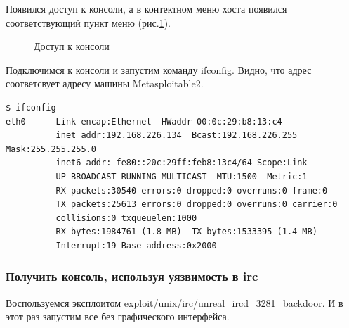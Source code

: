 \documentclass[10pt,a4paper,titlepage]{article}
\begin{document}
Появился доступ к консоли, а в контектном меню хоста появился соответствующий пункт меню (рис.\ref{ris:image7}).
\begin{figure}[h]	
\caption{Доступ к консоли}
\label{ris:image7}
\end{figure}
Подключимся к консоли и запустим команду ifconfig. Видно, что адрес соответсвует адресу машины Metasploitable2.
\begin{verbatim}
$ ifconfig
eth0      Link encap:Ethernet  HWaddr 00:0c:29:b8:13:c4  
          inet addr:192.168.226.134  Bcast:192.168.226.255  Mask:255.255.255.0
          inet6 addr: fe80::20c:29ff:feb8:13c4/64 Scope:Link
          UP BROADCAST RUNNING MULTICAST  MTU:1500  Metric:1
          RX packets:30540 errors:0 dropped:0 overruns:0 frame:0
          TX packets:25613 errors:0 dropped:0 overruns:0 carrier:0
          collisions:0 txqueuelen:1000 
          RX bytes:1984761 (1.8 MB)  TX bytes:1533395 (1.4 MB)
          Interrupt:19 Base address:0x2000 
\end{verbatim}

\subsubsection{Получить консоль, используя уязвимость в irc}
Воспользуемся эксплоитом exploit/unix/irc/unreal\_ircd\_3281\_backdoor. И в этот раз запустим все без графического интерфейса.
\end{document}
